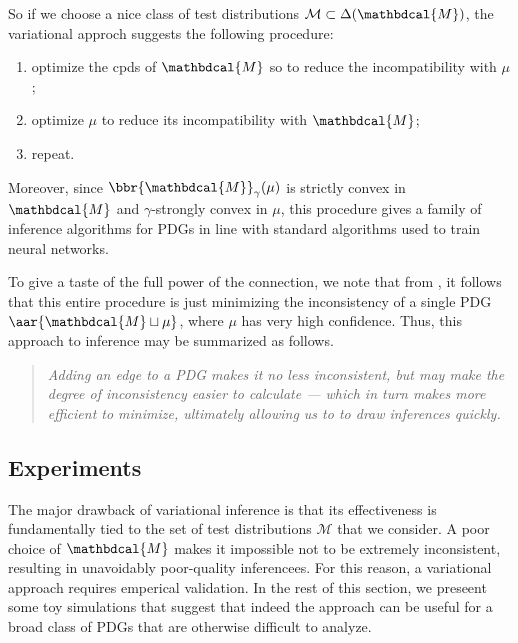 \documentclass{article}
\theoremstyle{plain}
\theoremstyle{definition}
\theoremstyle{remark}
\newcommand{\dg}[1]{\mathbdcal{#1}}
\newcommand{\bundle}{\mathbin{\sqcup}}
\begin{document}
So if we choose a nice class of test distributions $\mathcal M \subset \Delta(\dg M)$, the variational approch suggests the following procedure:
\begin{center}
	\begin{enumerate}[nosep]
		\item optimize the cpds of $\dg M$ so to reduce the incompatibility with $\mu$;
		\item optimize $\mu$ to reduce its incompatibility with $\dg M$;
		\item repeat.
	\end{enumerate}
\end{center}

Moreover, since $\bbr{\dg M}_\gamma(\mu)$ is strictly convex in $\dg M$ and $\gamma$-strongly convex in $\mu$, this procedure gives a family of inference algorithms for PDGs in line with standard algorithms used to train neural networks.

To give a taste of the full power of the connection, we note that from , it follows that this entire procedure is just minimizing the inconsistency of a single PDG $\aar{\dg M \bundle \mu}$, where $\mu$ has very high confidence.
Thus, this approach to inference may be summarized as follows.

\begin{quotation} \it
	\noindent Adding an edge to a PDG makes it no less inconsistent, but may make the degree of inconsistency easier to calculate --- which in turn makes more efficient to minimize, ultimately allowing us to to draw inferences quickly.
\end{quotation}



\subsection{Experiments}
	\label{sec:experiment-variational}

The major drawback of variational inference is that its effectiveness is fundamentally tied to the set of test distributions $\mathcal M$ that we consider.
A poor choice of $\dg M$ makes it impossible not to be extremely inconsistent, resulting in unavoidably poor-quality inferencees.
For this reason, a variational approach requires emperical validation. In the rest of this section, we preseent some toy simulations that suggest that indeed the approach can be useful for a broad class of PDGs that are otherwise difficult to analyze.
\end{document}

